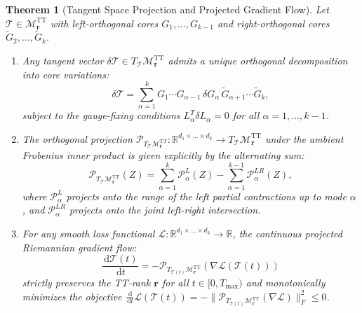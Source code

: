 \documentclass[11pt,a4paper,reqno]{amsart}
\newtheorem{theorem}{Theorem}[section]
\theoremstyle{definition}
\numberwithin{equation}{section}
\newcommand{\R}{\mathbb{R}}
\newcommand{\dif}{\,\mathrm{d}}
\begin{document}
\begin{theorem}[Tangent Space Projection and Projected Gradient Flow]
\label{thm:tt_tangent_proj}
Let $\mathcal{T} \in \mathcal{M}_{\mathbf{r}}^{\mathrm{TT}}$ with left-orthogonal cores $G_1, \dots, G_{k-1}$ and right-orthogonal cores $\widetilde{G}_2, \dots, \widetilde{G}_k$. 
\begin{enumerate}[label=(\roman*)]
    \item Any tangent vector $\delta \mathcal{T} \in T_{\mathcal{T}} \mathcal{M}_{\mathbf{r}}^{\mathrm{TT}}$ admits a unique orthogonal decomposition into core variations:
    \begin{equation}
        \delta \mathcal{T} = \sum_{\alpha=1}^k G_1 \cdots G_{\alpha-1} \, \delta G_\alpha \, \widetilde{G}_{\alpha+1} \cdots \widetilde{G}_k,
    \end{equation}
    subject to the gauge-fixing conditions $L_\alpha^T \delta L_\alpha = 0$ for all $\alpha = 1, \dots, k-1$.
    \item The orthogonal projection $\mathcal{P}_{T_{\mathcal{T}} \mathcal{M}_{\mathbf{r}}^{\mathrm{TT}}} \colon \R^{d_1 \times \dots \times d_k} \to T_{\mathcal{T}} \mathcal{M}_{\mathbf{r}}^{\mathrm{TT}}$ under the ambient Frobenius inner product is given explicitly by the alternating sum:
    \begin{equation}
        \label{eq:tt_proj_formula}
        \mathcal{P}_{T_{\mathcal{T}} \mathcal{M}_{\mathbf{r}}^{\mathrm{TT}}}(Z) = \sum_{\alpha=1}^k \mathcal{P}_{\alpha}^L(Z) - \sum_{\alpha=1}^{k-1} \mathcal{P}_{\alpha}^{LR}(Z),
    \end{equation}
    where $\mathcal{P}_{\alpha}^L$ projects onto the range of the left partial contractions up to mode $\alpha$, and $\mathcal{P}_{\alpha}^{LR}$ projects onto the joint left-right intersection.
    \item For any smooth loss functional $\mathcal{L} \colon \R^{d_1 \times \dots \times d_k} \to \R$, the continuous projected Riemannian gradient flow:
    \begin{equation}
        \label{eq:tt_flow}
        \frac{\dif \mathcal{T}(t)}{\dif t} = - \mathcal{P}_{T_{\mathcal{T}(t)} \mathcal{M}_{\mathbf{r}}^{\mathrm{TT}}}\left( \nabla \mathcal{L}(\mathcal{T}(t)) \right)
    \end{equation}
    strictly preserves the TT-rank $\mathbf{r}$ for all $t \in [0, T_{\max})$ and monotonically minimizes the objective $\frac{\dif}{\dif t}\mathcal{L}(\mathcal{T}(t)) = -\|\mathcal{P}_{T_{\mathcal{T}(t)} \mathcal{M}_{\mathbf{r}}^{\mathrm{TT}}}(\nabla \mathcal{L})\|_F^2 \le 0$.
\end{enumerate}
\end{theorem}
\end{document}
